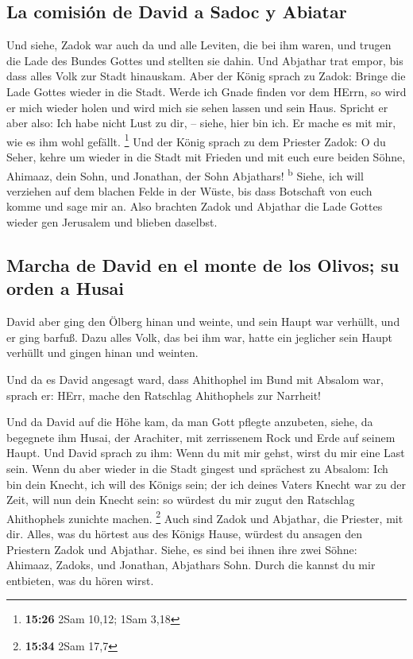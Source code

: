 \hypertarget{la-comisiuxf3n-de-david-a-sadoc-y-abiatar}{%
\subsection{La comisión de David a Sadoc y
Abiatar}\label{la-comisiuxf3n-de-david-a-sadoc-y-abiatar}}

 Und siehe, Zadok war auch da und alle Leviten, die bei
ihm waren, und trugen die Lade des Bundes Gottes und stellten sie dahin.
Und Abjathar trat empor, bis dass alles Volk zur Stadt hinauskam.
 Aber der König sprach zu Zadok: Bringe die Lade Gottes
wieder in die Stadt. Werde ich Gnade finden vor dem HErrn, so wird er
mich wieder holen und wird mich sie sehen lassen und sein Haus.
 Spricht er aber also: Ich habe nicht Lust zu dir, --
siehe, hier bin ich. Er mache es mit mir, wie es ihm wohl gefällt.
\footnote{\textbf{15:26} 2Sam 10,12; 1Sam 3,18}  Und der
König sprach zu dem Priester Zadok: O du Seher, kehre um wieder in die
Stadt mit Frieden und mit euch eure beiden Söhne, Ahimaaz, dein Sohn,
und Jonathan, der Sohn Abjathars! \textsuperscript{b} 
Siehe, ich will verziehen auf dem blachen Felde in der Wüste, bis dass
Botschaft von euch komme und sage mir an.  Also brachten
Zadok und Abjathar die Lade Gottes wieder gen Jerusalem und blieben
daselbst.

\hypertarget{marcha-de-david-en-el-monte-de-los-olivos-su-orden-a-husai}{%
\subsection{Marcha de David en el monte de los Olivos; su orden a
Husai}\label{marcha-de-david-en-el-monte-de-los-olivos-su-orden-a-husai}}

 David aber ging den Ölberg hinan und weinte, und sein
Haupt war verhüllt, und er ging barfuß. Dazu alles Volk, das bei ihm
war, hatte ein jeglicher sein Haupt verhüllt und gingen hinan und
weinten.

 Und da es David angesagt ward, dass Ahithophel im Bund
mit Absalom war, sprach er: HErr, mache den Ratschlag Ahithophels zur
Narrheit!

 Und da David auf die Höhe kam, da man Gott pflegte
anzubeten, siehe, da begegnete ihm Husai, der Arachiter, mit zerrissenem
Rock und Erde auf seinem Haupt.  Und David sprach zu ihm:
Wenn du mit mir gehst, wirst du mir eine Last sein.  Wenn
du aber wieder in die Stadt gingest und sprächest zu Absalom: Ich bin
dein Knecht, ich will des Königs sein; der ich deines Vaters Knecht war
zu der Zeit, will nun dein Knecht sein: so würdest du mir zugut den
Ratschlag Ahithophels zunichte machen. \footnote{\textbf{15:34} 2Sam
  17,7}  Auch sind Zadok und Abjathar, die Priester, mit
dir. Alles, was du hörtest aus des Königs Hause, würdest du ansagen den
Priestern Zadok und Abjathar.  Siehe, es sind bei ihnen
ihre zwei Söhne: Ahimaaz, Zadoks, und Jonathan, Abjathars Sohn. Durch
die kannst du mir entbieten, was du hören wirst.

